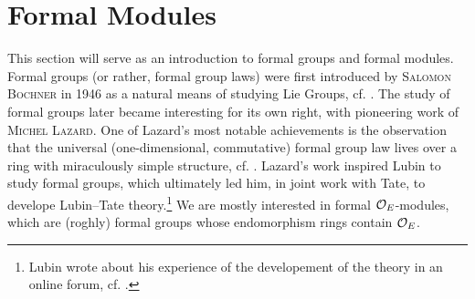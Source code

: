 \documentclass[../main.tex]{subfiles}
\begin{document}
\section{Formal Modules}
\label{sec:FormalModules}
This section will serve as an introduction to formal groups and 
formal modules. Formal groups (or rather, formal group laws) were first
introduced by \textsc{Salomon Bochner} in 1946 as a natural means of studying Lie
Groups, cf. \cite{Bochner1946FGrps}. The study of formal groups later became
interesting for its own right, with pioneering work of \textsc{Michel Lazard}. 
One of Lazard's most notable achievements is the observation that the universal
(one-dimensional, commutative) formal group law lives over a ring with
miraculously simple structure, cf. \cite{Lazard1955FGrps}. 
Lazard's work inspired Lubin to study formal groups, which ultimately led 
him, in joint work with Tate, to develope Lubin--Tate theory.\footnote{Lubin wrote
about his experience of the developement of the theory in an online forum, cf.
\cite{mathoverflowLUBIN}.}
We are mostly interested in formal $\mathcal{O}_E$-modules, which are (roghly) formal groups
whose endomorphism rings contain $\mathcal{O}_E$.
\end{document}
